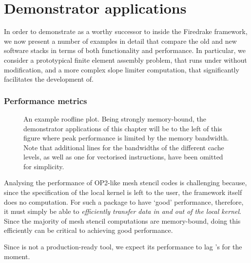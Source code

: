 \documentclass[thesis]{subfiles}
\begin{document}
\chapter{Demonstrator applications}
\label{chapter:demonstrator_applications}

In order to demonstrate  as a worthy successor to  inside the Firedrake framework, we now present a number of examples in detail that compare the old and new software stacks in terms of both functionality and performance.
In particular, we consider a prototypical finite element assembly problem, that runs under  without modification, and a more complex slope limiter computation, that  significantly facilitates the development of.

\subsection{Performance metrics}

\begin{figure}
  \centering
  
  \caption{
    An example roofline plot.
    Being strongly memory-bound, the demonstrator applications of this chapter will be to the left of this figure where peak performance is limited by the memory bandwidth.
    Note that additional lines for the bandwidths of the different cache levels, as well as one for vectorised instructions, have been omitted for simplicity.
  }
  \label{fig:roofline}
\end{figure}

Analysing the performance of OP2-like mesh stencil codes is challenging because, since the specification of the local kernel is left to the user, the framework itself does no computation.
For such a package to have `good' performance, therefore, it must simply be able to \emph{efficiently transfer data in and out of the local kernel}.
Since the majority of mesh stencil computations are memory-bound, doing this efficiently can be critical to achieving good performance.

\begin{tcolorbox}[title=Caveat]
  Since  is not a production-ready tool, we expect its performance to lag 's for the moment.
\end{tcolorbox}
\end{document}
